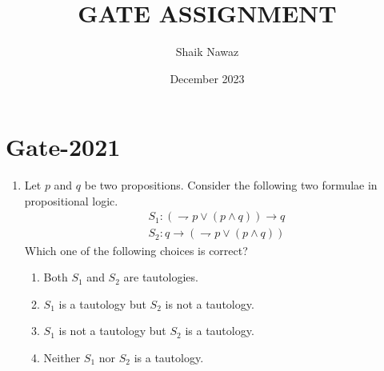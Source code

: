 \documentclass[12pt,-letter paper]{article}
\title{GATE ASSIGNMENT}
\author{Shaik Nawaz}
\date{December 2023}
\begin{document}
\maketitle
\section*{Gate-2021}
\begin{enumerate}
        \item Let $p$ and $q$ be two propositions. Consider the following two formulae in propositional logic.
			\begin{align}
				 S_1 : ( \rightharpoondown p \vee (p \wedge q))\rightarrow q \\
				 S_2 : q\rightarrow(\rightharpoondown p \vee (p \wedge q))
			\end{align}
        Which one of the following choices is correct?
		\begin{enumerate}
			\item Both $S_1$ and $S_2$ are tautologies.
			\item $S_1$ is a tautology but $S_2$ is not a tautology.
			\item $S_1$ is not a tautology but $S_2$ is a tautology.
			\item Neither $S_1$ nor $S_2$ is a tautology.
		\end{enumerate}
\end{enumerate}
\end{document}

